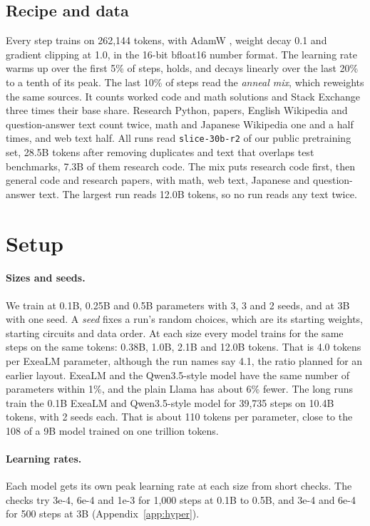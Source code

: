 \documentclass[10pt,twocolumn,letterpaper]{article}
\begin{document}
\subsection{Recipe and data}

Every step trains on 262,144 tokens, with AdamW \citep{loshchilov2019adamw}, weight decay 0.1 and gradient clipping at 1.0, in the 16-bit bfloat16 number format.
The learning rate warms up over the first 5\% of steps, holds, and decays linearly over the last 20\% to a tenth of its peak.
The last 10\% of steps read the \emph{anneal mix}, which reweights the same sources.
It counts worked code and math solutions and Stack Exchange three times their base share.
Research Python, papers, English Wikipedia and question-answer text count twice, math and Japanese Wikipedia one and a half times, and web text half.
All runs read \texttt{slice-30b-r2} of our public pretraining set, 28.5B tokens after removing duplicates and text that overlaps test benchmarks, 7.3B of them research code.
The mix puts research code first, then general code and research papers, with math, web text, Japanese and question-answer text.
The largest run reads 12.0B tokens, so no run reads any text twice.

\section{Setup}
\label{sec:setup}

\paragraph{Sizes and seeds.}
We train at 0.1B, 0.25B and 0.5B parameters with 3, 3 and 2 seeds, and at 3B with one seed.
A \emph{seed} fixes a run's random choices, which are its starting weights, starting circuits and data order.
At each size every model trains for the same steps on the same tokens: 0.38B, 1.0B, 2.1B and 12.0B tokens.
That is 4.0 tokens per ExeaLM parameter, although the run names say 4.1, the ratio planned for an earlier layout.
ExeaLM and the Qwen3.5-style model have the same number of parameters within 1\%, and the plain Llama has about 6\% fewer.
The long runs train the 0.1B ExeaLM and Qwen3.5-style model for 39,735 steps on 10.4B tokens, with 2 seeds each.
That is about 110 tokens per parameter, close to the 108 of a 9B model trained on one trillion tokens.

\paragraph{Learning rates.}
Each model gets its own peak learning rate at each size from short checks.
The checks try 3e-4, 6e-4 and 1e-3 for 1,000 steps at 0.1B to 0.5B, and 3e-4 and 6e-4 for 500 steps at 3B (Appendix~\ref{app:hyper}).
\end{document}
